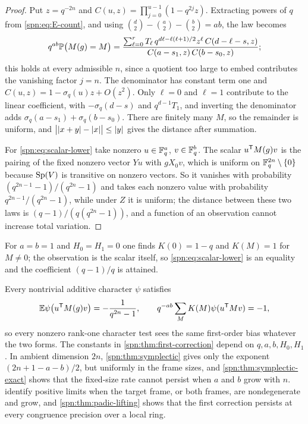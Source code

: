 \begin{proof}
Put $z=q^{-2n}$ and $C(u,z)=\prod_{j=0}^{u-1}(1-q^{2j}z)$. Extracting powers of
$q$ from \eqref{spn:eq:E-count}, and using
$\binom d2-\binom a2-\binom b2=ab$, the law becomes
\[
 q^{ab}\mathbb{P}\bigl(M(g)=M\bigr)=\frac{\sum_{\ell=0}^rT_\ell\,
 q^{d\ell-\ell(\ell+1)/2}z^\ell\,C(d-\ell-s,z)}{C(a-s_1,z)\,C(b-s_0,z)} ;
\]
this holds at every admissible $n$, since a quotient too large to embed
contributes the vanishing factor $j=n$. The denominator has constant term one
and $C(u,z)=1-\sigma_q(u)z+O(z^2)$. Only $\ell=0$ and $\ell=1$ contribute to the
linear coefficient, with $-\sigma_q(d-s)$ and $q^{d-1}T_1$, and inverting the
denominator adds $\sigma_q(a-s_1)+\sigma_q(b-s_0)$. There are finitely many
$M$, so the remainder is uniform, and $\bigl|\lvert x+y\rvert-\lvert x\rvert\bigr|\le\lvert y\rvert$
gives the distance after summation.

For \eqref{spn:eq:scalar-lower} take nonzero $u\in\mathbb{F}_q^a$, $v\in\mathbb{F}_q^b$. The
scalar $u^{\mathsf{T}}M(g)v$ is the pairing of the fixed nonzero vector $Yu$ with
$gX_0v$, which is uniform on $\mathbb{F}_q^{2n}\setminus\{0\}$ because $\operatorname{Sp}(V)$ is
transitive on nonzero vectors. So it vanishes with probability
$(q^{2n-1}-1)/(q^{2n}-1)$ and takes each nonzero value with probability
$q^{2n-1}/(q^{2n}-1)$, while under $Z$ it is uniform; the distance between these
two laws is $(q-1)/(q(q^{2n}-1))$, and a function of an observation cannot
increase total variation.
\end{proof}

For $a=b=1$ and $H_0=H_1=0$ one finds $K(0)=1-q$ and $K(M)=1$ for $M\ne0$; the
observation is the scalar itself, so \eqref{spn:eq:scalar-lower} is an
equality and the coefficient $(q-1)/q$ is attained.

Every nontrivial additive character $\psi$ satisfies
\[
 \mathbb{E}\psi\bigl(u^{\mathsf{T}}M(g)v\bigr)=-\frac1{q^{2n}-1},\qquad
 q^{-ab}\sum_MK(M)\psi(u^{\mathsf{T}}Mv)=-1,
\]
so every nonzero rank-one character
test sees the same first-order bias whatever the two forms. The constants in
\cref{spn:thm:first-correction} depend on $q,a,b,H_0,H_1$. In ambient
dimension $2n$, \cref{spn:thm:symplectic} gives only the exponent
$(2n+1-a-b)/2$, but uniformly in the frame sizes, and
\cref{spn:thm:symplectic-exact} shows that the fixed-size rate cannot persist
when $a$ and $b$ grow with $n$. 
identify positive limits when the target frame, or both frames, are
nondegenerate and grow, and \cref{spn:thm:padic-lifting} shows that the first
correction persists at every congruence precision over a local ring.


